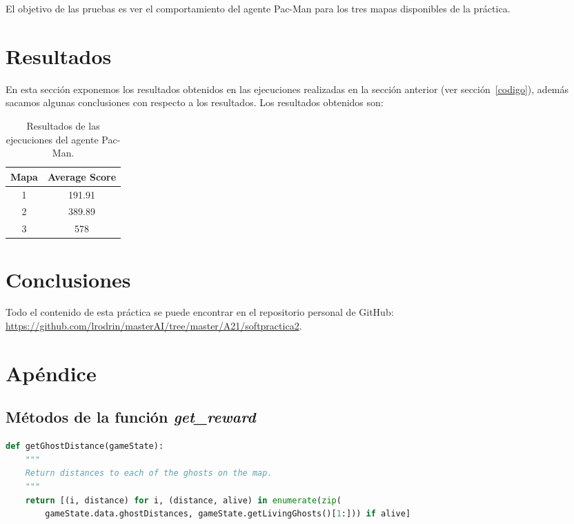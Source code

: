 \documentclass[11pt]{exam}
\begin{document}
El objetivo de las pruebas es ver el comportamiento del agente Pac-Man para los tres mapas disponibles de la práctica.

\section{Resultados}\label{resultados}

En esta sección exponemos los resultados obtenidos en las ejecuciones realizadas en la sección anterior (ver sección~\ref{codigo}), además sacamos algunas conclusiones con respecto a los resultados. Los resultados obtenidos son:

\begin{table}[H]
	\centering
	\begin{tabular}{|c|c|} 
		\hline
		Mapa & Average Score \\ 
		\hline
		1 & 191.91 \\ 
		2 & 389.89 \\
		3 & 578 \\
		\hline
	\end{tabular}
	\caption{Resultados de las ejecuciones del agente Pac-Man.}
	\label{resultados_ejecuciones}
\end{table}
\section{Conclusiones}\label{conclusiones}


Todo el contenido de esta práctica se puede encontrar en el repositorio personal de GitHub: \url{https://github.com/lrodrin/masterAI/tree/master/A21/softpractica2}.

\section{Apéndice}\label{apendice}

\subsection{Métodos de la función \textit{get\_reward}}\label{apendice_reward}

\begin{lstlisting}[language=python, basicstyle=\footnotesize]
def getGhostDistance(gameState):
	"""
	Return distances to each of the ghosts on the map.
	"""
	return [(i, distance) for i, (distance, alive) in enumerate(zip(
		gameState.data.ghostDistances, gameState.getLivingGhosts()[1:])) if alive]
\end{lstlisting}
\end{document}
